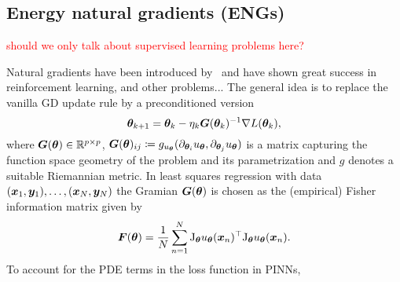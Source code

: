 \subsection{Energy natural gradients (ENGs)}

\textcolor{red}{should we only talk about supervised learning problems here?}

Natural gradients have been introduced by~\citet{amari1998natural} and have shown great success in reinforcement learning, and other problems...
The general idea is to replace the vanilla GD update rule by a preconditioned version
    \[ {\bm{\theta}}_{k+1} = {\bm{\theta}}_k - \eta_k {\bm{G}}({\bm{\theta}}_k)^{-1} \nabla L({\bm{\theta}}_k), \]
where ${\bm{G}}({\bm{\theta}})\in\mathbb R^{p\times p}$, ${\bm{G}}({\bm{\theta}})_{ij} \coloneqq g_{u_{\bm{\theta}}}(\partial_{{\bm{\theta}}_i} u_{\bm{\theta}}, \partial_{{\bm{\theta}}_j} u_{\bm{\theta}})$ is a matrix capturing the function space geometry of the problem and its parametrization and $g$ denotes a suitable Riemannian metric.
In least squares regression with data $({\bm{x}}_1, {\bm{y}}_1), \dots, ({\bm{x}}_N, {\bm{y}}_N)$ the Gramian ${\bm{G}}({\bm{\theta}})$ is chosen as the (empirical) Fisher information matrix given by~\citep{martens2020new, eschenhagen2023kroneckerfactored}
\begin{equation}
  {\bm{F}}({\bm{\theta}}) = \frac1N\sum_{n=1}^N \mathrm{J}_{{\bm{\theta}}} u_{{\bm{\theta}}}({\bm{x}}_n)^\top \mathrm{J}_{{\bm{\theta}}} u_{{\bm{\theta}}}({\bm{x}}_n)
  .
\end{equation}
To account for the PDE terms in the loss function in PINNs,
